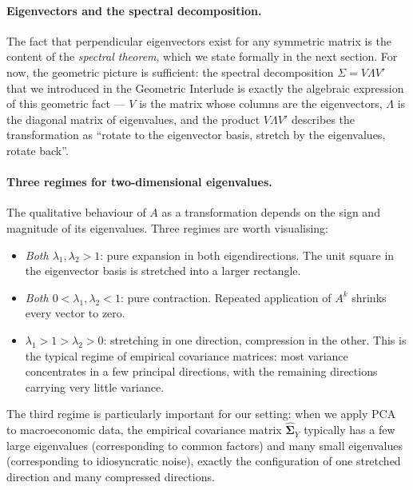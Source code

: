 \documentclass[11pt, a4paper, oneside]{article}
\begin{document}
\paragraph{Eigenvectors and the spectral decomposition.}
The fact that perpendicular eigenvectors exist for any symmetric
matrix is the content of the \emph{spectral theorem}, which we state
formally in the next section. For now, the geometric picture is
sufficient: the spectral decomposition $\Sigma = V \Lambda V'$ that
we introduced in the Geometric Interlude is exactly the algebraic
expression of this geometric fact — $V$ is the matrix whose columns
are the eigenvectors, $\Lambda$ is the diagonal matrix of
eigenvalues, and the product $V \Lambda V'$ describes the
transformation as ``rotate to the eigenvector basis, stretch by the
eigenvalues, rotate back''.

\paragraph{Three regimes for two-dimensional eigenvalues.}
The qualitative behaviour of $A$ as a transformation depends on the
sign and magnitude of its eigenvalues. Three regimes are worth
visualising:
\begin{itemize}[leftmargin=1.5em, itemsep=3pt]
    \item \emph{Both $\lambda_1, \lambda_2 > 1$}: pure expansion in
          both eigendirections. The unit square in the eigenvector
          basis is stretched into a larger rectangle.
    \item \emph{Both $0 < \lambda_1, \lambda_2 < 1$}: pure
          contraction. Repeated application of $A^k$ shrinks every
          vector to zero.
    \item \emph{$\lambda_1 > 1 > \lambda_2 > 0$}: stretching in one
          direction, compression in the other. This is the typical
          regime of empirical covariance matrices: most variance
          concentrates in a few principal directions, with the
          remaining directions carrying very little variance.
\end{itemize}

The third regime is particularly important for our setting: when we
apply PCA to macroeconomic data, the empirical covariance matrix
$\widehat{\boldsymbol{\Sigma}}_Y$ typically has a few large
eigenvalues (corresponding to common factors) and many small
eigenvalues (corresponding to idiosyncratic noise), exactly the
configuration of one stretched direction and many compressed
directions.
\end{document}
